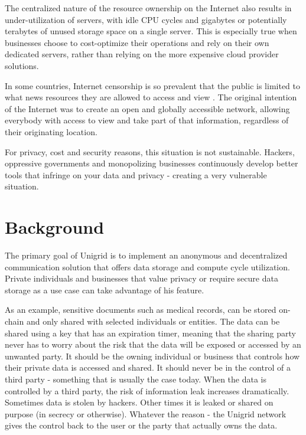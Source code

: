 \documentclass{article}
\begin{document}
\noindent The centralized nature of the resource ownership on the Internet also results in under-utilization of servers, with idle CPU cycles and gigabytes or potentially terabytes of unused storage space on a single server. This is especially true when businesses choose to cost-optimize their operations and rely on their own dedicated servers, rather than relying on the more expensive cloud provider solutions.

In some countries, Internet censorship is so prevalent that the public is limited to what news resources they are allowed to access and view \cite{wiki2021}. The original intention of the Internet was to create an open and globally accessible network, allowing everybody with access to view and take part of that information, regardless of their originating location.

For privacy, cost and security reasons, this situation is not sustainable. Hackers, oppressive governments and monopolizing businesses continuously develop better tools that infringe on your data and privacy - creating a very vulnerable situation.

\section{Background}
The primary goal of Unigrid is to implement an anonymous and decentralized communication solution that offers data storage and compute cycle utilization. Private individuals and businesses that value privacy or require secure data storage as a use case can take advantage of his feature.

As an example, sensitive documents such as medical records, can be stored on-chain and only shared with selected individuals or entities. The data can be shared using a key that has an expiration timer, meaning that the sharing party never has to worry about the risk that the data will be exposed or accessed by an unwanted party. It should be the owning individual or business that controls how their private data is accessed and shared. It should never be in the control of a third party - something that is usually the case today. When the data is controlled by a third party, the risk of information leak increases dramatically. Sometimes data is stolen by hackers. Other times it is leaked or shared on purpose (in secrecy or otherwise). Whatever the reason - the Unigrid network gives the control back to the user or the party that actually owns the data.
\end{document}
